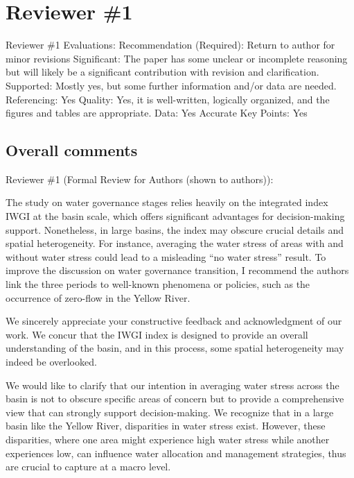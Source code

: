 \section{Reviewer \#1}\label{reviewer_1}

Reviewer \#1 Evaluations:
Recommendation (Required): Return to author for minor revisions
Significant: The paper has some unclear or incomplete reasoning but will likely be a significant contribution with revision and clarification.
Supported: Mostly yes, but some further information and/or data are needed.
Referencing: Yes
Quality: Yes, it is well-written, logically organized, and the figures and tables are appropriate.
Data: Yes
Accurate Key Points: Yes

\subsection*{Overall comments}

Reviewer \#1 (Formal Review for Authors (shown to authors)):

\RC{} The study on water governance stages relies heavily on the integrated index IWGI at the basin scale, which offers significant advantages for decision-making support. Nonetheless, in large basins, the index may obscure crucial details and spatial heterogeneity. For instance, averaging the water stress of areas with and without water stress could lead to a misleading ``no water stress'' result. To improve the discussion on water governance transition, I recommend the authors link the three periods to well-known phenomena or policies, such as the occurrence of zero-flow in the Yellow River.

\AR{} We sincerely appreciate your constructive feedback and acknowledgment of our work. We concur that the IWGI index is designed to provide an overall understanding of the basin, and in this process, some spatial heterogeneity may indeed be overlooked.

\AR*{} We would like to clarify that our intention in averaging water stress across the basin is not to obscure specific areas of concern but to provide a comprehensive view that can strongly support decision-making. We recognize that in a large basin like the Yellow River, disparities in water stress exist. However, these disparities, where one area might experience high water stress while another experiences low, can influence water allocation and management strategies, thus are crucial to capture at a macro level.

